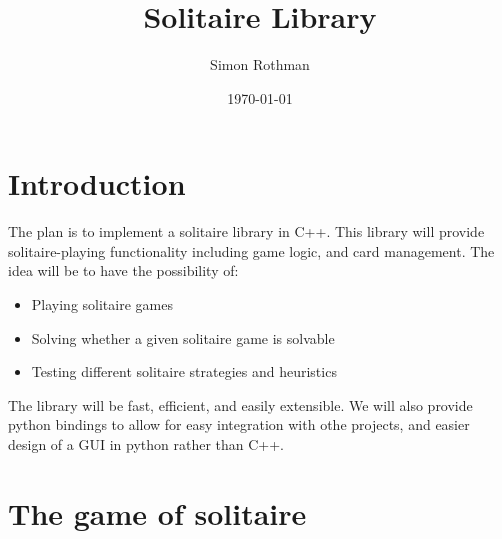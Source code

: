 \documentclass[11pt]{article}
\title{Solitaire Library}
\author{Simon Rothman}
\date{\today}
\begin{document}
\maketitle

\section{Introduction}

The plan is to implement a solitaire library in C++.
This library will provide solitaire-playing functionality including game logic, and card management. 
The idea will be to have the possibility of:
\begin{itemize}
    \item Playing solitaire games
    \item Solving whether a given solitaire game is solvable
    \item Testing different solitaire strategies and heuristics
\end{itemize}
The library will be fast, efficient, and easily extensible. 
We will also provide python bindings to allow for easy integration with othe projects, and easier design of a GUI in python rather than C++.

\section{The game of solitaire}
\end{document}
